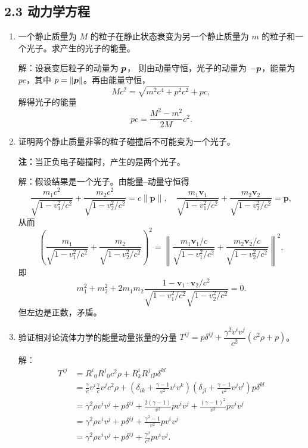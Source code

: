 \subsection{2.3 动力学方程}
\begin{enumerate}
\item 一个静止质量为 $M$ 的粒子在静止状态衰变为另一个静止质量为 $m$ 的粒子和一个光子。求产生的光子的能量。

解：设衰变后粒子的动量为 $\boldsymbol{p}$，
则由动量守恒，光子的动量为 $-\boldsymbol{p}$，能量为 $pc$，其中 $p=\|\boldsymbol{p}\|$。再由能量守恒，
$$Mc^{2}=\sqrt{m^{2}c^{4}+p^{2}c^{2}}+pc,$$
解得光子的能量
$$pc=\frac{M^{2}-m^{2}}{2M} c^{2}.$$

\item 证明两个静止质量非零的粒子碰撞后不可能变为一个光子。

\textbf{注：}当正负电子碰撞时，产生的是两个光子。

解：假设结果是一个光子。由能量--动量守恒得
$$\frac{m_{1}c^{2}}{\sqrt{1-v_{1}^{2}/c^{2}}}+\frac{m_{2}c^{2}}{\sqrt{1-v_{2}^{2}/c^{2}}}=c\|\boldsymbol{p}\|, \quad 
\frac{m_{1}\boldsymbol{v}_{1}}{\sqrt{1-v_{1}^{2}/c^{2}}}+\frac{m_{2}\boldsymbol{v}_{2}}{\sqrt{1-v_{2}^{2}/c^{2}}}=\boldsymbol{p},$$
从而
$$\left(\frac{m_{1}}{\sqrt{1-v_{1}^{2}/c^{2}}}+\frac{m_{2}}{\sqrt{1-v_{2}^{2}/c^{2}}}\right)^{2}
=\left\|\frac{m_{1}\boldsymbol{v}_{1}/c}{\sqrt{1-v_{1}^{2}/c^{2}}}+\frac{m_{2} \boldsymbol{v}_{2}/c}{\sqrt{1-v_{2}^{2}/c^{2}}}\right\|^{2},$$
即
$$m_{1}^{2}+m_{2}^{2}+2m_{1} m_{2} \frac{1-\boldsymbol{v}_{1} \cdot \boldsymbol{v}_{2}/c^{2}}{\sqrt{1-v_{1}^{2}/c^{2}} \sqrt{1-v_{2}^{2}/c^{2}}}=0.$$
但左边是正数，矛盾。

\item 验证相对论流体力学的能量动量张量的分量 $T^{ij}=p\delta^{ij}+\dfrac{\gamma^2 v^i v^j}{c^2}(c^2\rho+p)$。

解：\begin{align*}
T^{ij} & =R^{i}{ }_{0} R^{j}{ }_{0} c^{2} \rho+R_{k}^{i} R^{j}{ }_{l} p \delta^{kl} \\
& =\frac{\gamma}{c} v^{i} \frac{\gamma}{c} v^{j} c^{2} \rho+\left(\delta_{ik}+\frac{\gamma-1}{v^{2}} v^{i} v^{k}\right)\left(\delta_{jl}+\frac{\gamma-1}{v^{2}} v^{j} v^{l}\right) p \delta^{kl} \\
& =\gamma^{2} \rho v^{i} v^{j}+p \delta^{ij}+\frac{2(\gamma-1)}{v^{2}} p v^{i} v^{j}+\frac{(\gamma-1)^{2}}{v^{2}} p v^{i} v^{j} \\
& =\gamma^{2} \rho v^{i} v^{j}+p \delta^{ij}+\frac{\gamma^{2}-1}{v^{2}} p v^{i} v^{j} \\
& =\gamma^{2} \rho v^{i} v^{j}+p \delta^{ij}+\frac{\gamma^{2}}{c^{2}} p v^{i} v^{j}.
\end{align*}
\end{enumerate}

